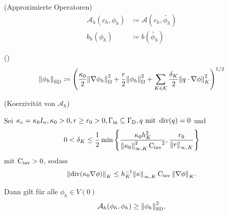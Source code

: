 \begin{define}(Approximierte Operatoren)
	\begin{align*}
		\mathcal{A}_h(c_h, \phi_h) &\coloneqq 
		\mathcal{A}(c_h,\tilde{\phi_h}) \\
		b_h(\phi_h) &\coloneqq  b(\tilde{\phi_h})
	\end{align*}
\end{define}


\begin{define}()
	 \[ \norm{\phi_h}_{\operatorname{\text{SD}}} \coloneqq \left( \frac{\kappa_0}{2} \norm{\nabla \phi_h}_\Omega^2 + \frac{r}{2} \norm{\phi_h}_\Omega^2+ \sum_{K \in \mathcal{K}} \frac{\delta_K}{2} \norm{q \cdot \nabla \phi}_K^2  \right)^{1/2}  \]
\end{define}

\begin{Lemma}(Koerzivität von $ \mathcal{A}_h $)
	
	Sei $ \kappa_c = \kappa_0 I_n, \kappa_0 > 0, r \geq r_0 > 0, \Gamma_{{\text{in}}} \subseteq \Gamma_{\text{D}}, q \text{ mit } \operatorname{div}(q) = 0 $ und \[ 0 < \delta_K \leq \frac{1}{2} \min\left\{ \frac{\kappa_0 h_K^2}{\norm{\kappa_0}_{\infty,K}^2 \operatorname{C_{\text{inv}}}^2} , \frac{r_0}{\norm{r}_{\infty, K}}   \right\}\] mit $ \operatorname{C_{\text{inv}}} > 0 $, sodass  \[ \norm{\operatorname{div}(\kappa_0 \nabla \phi)}_K \leq h_K^{-1} \norm{\kappa}_{\infty,K} \operatorname{C_{\text{inv}}} \norm{\nabla \phi}_K. \]
	
	Dann gilt für alle $ \phi_h \in V(0) $
	\[ \mathcal{A}_h(\phi_h, \phi_h) \geq \norm{\phi_h}_{\operatorname{\text{SD}}}^2. \]
\end{Lemma}

